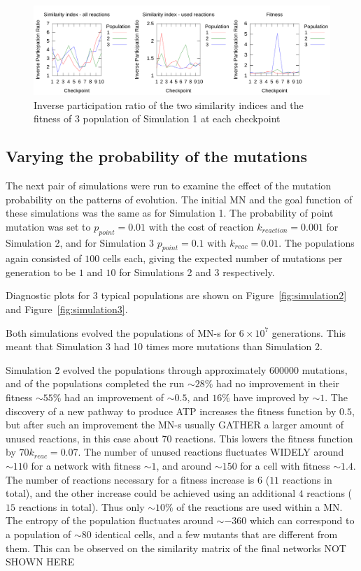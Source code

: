 \documentclass[a4paper,12pt]{article}
\begin{document}
\begin{figure}[htpb]
	\centering
	\includegraphics[width=1\linewidth]{IPR_sim1.pdf}
	\caption{Inverse participation ratio of the two similarity indices and the fitness of $3$ population of Simulation 1 at each checkpoint}
	\label{fig:IPRsim1}
\end{figure}


\subsection{Varying the probability of the mutations}
\label{sub:the_probability_of_the_mutations}

The next pair of simulations were run to examine the effect of the mutation probability on the patterns of evolution. The initial MN and the goal function of these simulations was the same as for Simulation 1. The probability of point mutation was set to $p_{point}=0.01$ with the cost of reaction $k_{reaction}=0.001$ for Simulation 2, and for Simulation 3 $p_{point}=0.1$ with $k_{reac}=0.01$. The populations again consisted of $100$ cells each, giving the expected number of mutations per generation to be $1$ and $10$ for Simulations 2 and 3 respectively. 

Diagnostic plots for $3$ typical populations are shown on Figure~\ref{fig:simulation2} and Figure~\ref{fig:simulation3}.

Both simulations evolved the populations of MN-s for $6\times 10^7$ generations. This meant that Simulation 3 had 10 times more mutations than Simulation 2. 

Simulation 2 evolved the populations through approximately $600 000$ mutations, and of the populations completed the run $\sim 28 \%$ had no improvement in their fitness $\sim 55 \%$ had an improvement of $\sim 0.5$, and $16 \%$ have improved by $\sim 1$. The discovery of a new pathway to produce ATP increases the fitness function by $0.5$, but after such an improvement the MN-s usually GATHER a larger amount of unused reactions, in this case about $70$ reactions. This lowers the fitness function by $70 k_{reac}=0.07$. The number of unused reactions fluctuates WIDELY around $\sim 110$ for a network with fitness $\sim 1$, and around $\sim 150$ for a cell with fitness $\sim 1.4$. The number of reactions necessary for a fitness increase is $6$ ($11$ reactions in total), and the other increase could be achieved using an additional $4$ reactions ($15$ reactions in total). Thus only $\sim 10\%$ of the reactions are used within a MN.  The entropy of the population fluctuates around $\sim -360$ which can correspond to a population of $\sim 80$ identical cells, and a few mutants that are different from them. This can be observed on the similarity matrix of the final networks NOT SHOWN HERE
\end{document}
